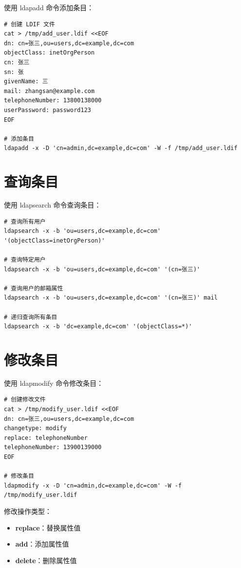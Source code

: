 \documentclass[12pt,UTF8]{ctexbook}
\begin{document}
使用 ldapadd 命令添加条目：

\begin{verbatim}
# 创建 LDIF 文件
cat > /tmp/add_user.ldif <<EOF
dn: cn=张三,ou=users,dc=example,dc=com
objectClass: inetOrgPerson
cn: 张三
sn: 张
givenName: 三
mail: zhangsan@example.com
telephoneNumber: 13800138000
userPassword: password123
EOF

# 添加条目
ldapadd -x -D 'cn=admin,dc=example,dc=com' -W -f /tmp/add_user.ldif
\end{verbatim}

\section{查询条目}
\label{sec:search_entry}

使用 ldapsearch 命令查询条目：

\begin{verbatim}
# 查询所有用户
ldapsearch -x -b 'ou=users,dc=example,dc=com' '(objectClass=inetOrgPerson)'

# 查询特定用户
ldapsearch -x -b 'ou=users,dc=example,dc=com' '(cn=张三)'

# 查询用户的邮箱属性
ldapsearch -x -b 'ou=users,dc=example,dc=com' '(cn=张三)' mail

# 递归查询所有条目
ldapsearch -x -b 'dc=example,dc=com' '(objectClass=*)'
\end{verbatim}

\section{修改条目}
\label{sec:modify_entry}

使用 ldapmodify 命令修改条目：

\begin{verbatim}
# 创建修改文件
cat > /tmp/modify_user.ldif <<EOF
dn: cn=张三,ou=users,dc=example,dc=com
changetype: modify
replace: telephoneNumber
telephoneNumber: 13900139000
EOF

# 修改条目
ldapmodify -x -D 'cn=admin,dc=example,dc=com' -W -f /tmp/modify_user.ldif
\end{verbatim}

修改操作类型：
\begin{itemize}
    \item \textbf{replace}：替换属性值
    \item \textbf{add}：添加属性值
    \item \textbf{delete}：删除属性值
\end{itemize}
\end{document}
